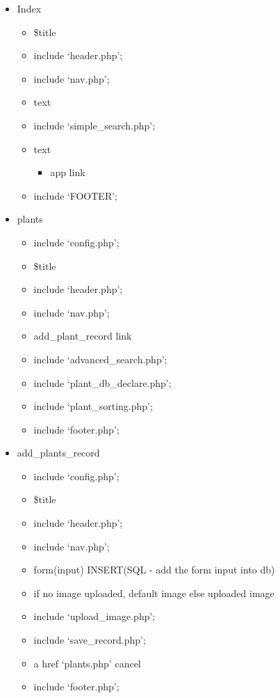 \begin{itemize}
	\item Index
	\begin{itemize}
		\item \$title
		\item include `header.php';
		\item include `nav.php';
		\item text
		\item include `simple\_search.php';
		\item text
		\begin{itemize}
			\item app link
		\end{itemize}
		\item include `FOOTER';
	\end{itemize}	

	\item plants
	\begin{itemize}
		\item include `config.php';
		\item \$title
		\item include `header.php';
		\item include `nav.php';
		\item add\_plant\_record link
		\item include `advanced\_search.php';
		\item include `plant\_db\_declare.php';
		\item include `plant\_sorting.php';
		\item include `footer.php';
	\end{itemize}
	\item add\_plants\_record
	\begin{itemize}
		\item include `config.php';
		\item \$title
		\item include `header.php';
		\item include `nav.php';
		\item form(input)  INSERT(SQL - add the form input into db)
		\item if no image uploaded, default image else uploaded image
		\item include `upload\_image.php';
		\item include `save\_record.php';
		\item a href `plants.php' cancel
		\item include `footer.php';
	\end{itemize}
	

\end{itemize}
